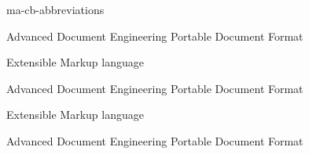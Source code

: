 \startenvironment ma-cb-abbreviations


\startmode[**nl]

       {Advanced Document Engineering}
      {}
     {}
       {}
     {}
       {}
       {}
       {}
        {}
      {}
    {}
       {}
       {Portable Document Format}
        {}
       {}
      {}
        {}
       {}
        {}
   {}

       {Extensible Markup language}
\stopmode

\startmode[**en,**uk]

       {Advanced Document Engineering}
      {}
     {}
       {}
     {}
       {}
       {}
       {}
        {}
      {}
    {}
       {}
       {Portable Document Format}
        {}
       {}
      {}
        {}
       {}
        {}
   {}

       {Extensible Markup language}
\stopmode

\startmode[**cz]

       {Advanced Document Engineering}
      {}
     {}
       {}
     {}
       {}
       {}
       {}
        {}
      {}
    {}
       {}
       {Portable Document Format}
        {}
       {}
      {}
        {}
       {}
        {}
   {}

